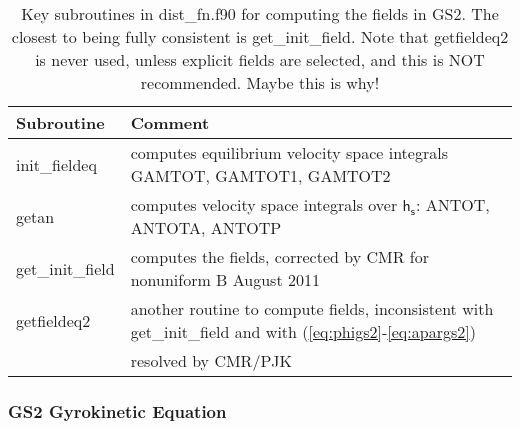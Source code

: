 \documentclass[10pt,a4paper]{article}
\newcommand{\g}[1]{\mathsf{#1}}
\begin{document}
\begin{table}[htb]
\begin{tabular}{|l|l|}
  \hline
  Subroutine & Comment \\
  \hline
  init\_fieldeq & computes equilibrium velocity space integrals GAMTOT, GAMTOT1, GAMTOT2 \\
  getan         & computes velocity space integrals over $\g{h_s}$:  ANTOT, ANTOTA, ANTOTP \\
  get\_init\_field & computes the fields, corrected by CMR for nonuniform B August 2011 \\
  getfieldeq2   & another routine to compute fields, inconsistent with get\_init\_field and with (\ref{eq:phigs2}-\ref{eq:apargs2})\\
  &  resolved by CMR/PJK \\
  \hline
\end{tabular}
\caption{\label{tab:gs2routines} Key subroutines in dist\_fn.f90 for computing
  the fields in GS2.  The closest to being fully consistent is
  get\_init\_field.  Note that getfieldeq2 is never used, unless explicit
  fields are selected, and this is NOT recommended. Maybe this is why!} 
\end{table}

\subsubsection{GS2 Gyrokinetic Equation}
\end{document}
